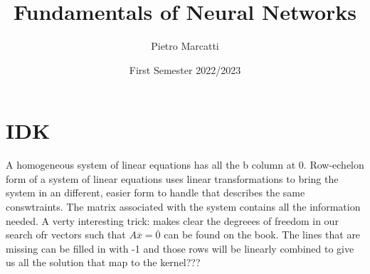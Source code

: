 \documentclass{article}
\title{Fundamentals of Neural Networks}
\author{Pietro Marcatti}
\date{First Semester 2022/2023}
\begin{document}
\maketitle

\section*{IDK}
A homogeneous system of linear equations has all the b column at 0.
Row-echelon form of a system of linear equations uses linear transformations to bring the system in an different, easier form to handle that describes the same conswtraints. The matrix associated with the system contains all the information needed. A verty interesting trick: makes clear the degreees of freedom in our search ofr vectors such that $A\overline{x} = \overline{0}$ can be found on the book. The lines that are missing can be filled in with -1 and those rows will be linearly combined to give us all the solution that map to the kernel???
\end{document}
